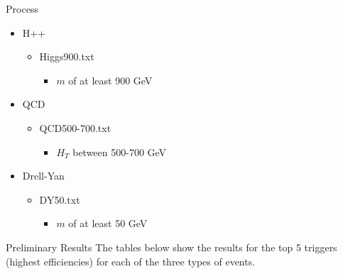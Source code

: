 \documentclass{beamer}
\newlength{\colwidth}
\begin{document}
\begin{frame}[t]
\begin{columns}[t]
\begin{column}{\colwidth}
\begin{block}{Process}
    \begin{itemize}
        \item H++
        \begin{itemize}
            \item Higgs900.txt
            \begin{itemize}
                \item $m$ of at least 900 GeV
            \end{itemize}
        \end{itemize}
        \item QCD
        \begin{itemize}
            \item QCD500-700.txt
            \begin{itemize}
                \item $H_T$ between 500-700 GeV
            \end{itemize}
        \end{itemize}
        \item Drell-Yan
        \begin{itemize}
            \item DY50.txt
            \begin{itemize}
                \item $m$ of at least 50 GeV
            \end{itemize}
        \end{itemize}
    \end{itemize}
  \end{block}

  \begin{block}{Preliminary Results}
    The tables below show the results for the top 5 triggers (highest efficiencies) for each of the three types of events.


\end{block}
\end{column}
\end{columns}
\end{frame}
\end{document}
